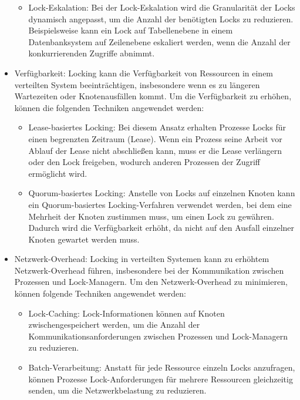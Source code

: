 \begin{itemize}
\begin{itemize}
\item Lock-Eskalation: Bei der Lock-Eskalation wird die Granularität der Locks dynamisch angepasst, um die Anzahl der benötigten Locks zu reduzieren. Beispielsweise kann ein Lock auf Tabellenebene in einem Datenbanksystem auf Zeilenebene eskaliert werden, wenn die Anzahl der konkurrierenden Zugriffe abnimmt.
\end{itemize}
\item Verfügbarkeit: Locking kann die Verfügbarkeit von Ressourcen in einem verteilten System beeinträchtigen, insbesondere wenn es zu längeren Wartezeiten oder Knotenausfällen kommt. Um die Verfügbarkeit zu erhöhen, können die folgenden Techniken angewendet werden:
\begin{itemize}
\item Lease-basiertes Locking: Bei diesem Ansatz erhalten Prozesse Locks für einen begrenzten Zeitraum (Lease). Wenn ein Prozess seine Arbeit vor Ablauf der Lease nicht abschließen kann, muss er die Lease verlängern oder den Lock freigeben, wodurch anderen Prozessen der Zugriff ermöglicht wird.

\item Quorum-basiertes Locking: Anstelle von Locks auf einzelnen Knoten kann ein Quorum-basiertes Locking-Verfahren verwendet werden, bei dem eine Mehrheit der Knoten zustimmen muss, um einen Lock zu gewähren. Dadurch wird die Verfügbarkeit erhöht, da nicht auf den Ausfall einzelner Knoten gewartet werden muss.
\end{itemize}
\item Netzwerk-Overhead: Locking in verteilten Systemen kann zu erhöhtem Netzwerk-Overhead führen, insbesondere bei der Kommunikation zwischen Prozessen und Lock-Managern. Um den Netzwerk-Overhead zu minimieren, können folgende Techniken angewendet werden:
\begin{itemize}
\item Lock-Caching: Lock-Informationen können auf Knoten zwischengespeichert werden, um die Anzahl der Kommunikationsanforderungen zwischen Prozessen und Lock-Managern zu reduzieren.
\item Batch-Verarbeitung: Anstatt für jede Ressource einzeln Locks anzufragen, können Prozesse Lock-Anforderungen für mehrere Ressourcen gleichzeitig senden, um die Netzwerkbelastung zu reduzieren.
\end{itemize}
\end{itemize}
